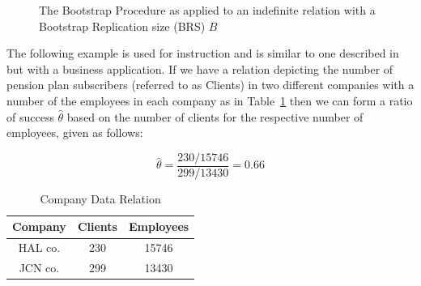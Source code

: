 \begin{figure}[ht]
\centerline{}
\caption{\label{rev:bootstrap} The Bootstrap Procedure as applied to an
indefinite relation with a Bootstrap Replication size (BRS) $B$}
\end{figure}

The following example is used for instruction and is similar
to one described in \cite{et93} but with a business 
application.
If we have a relation depicting the number of pension plan subscribers
(referred to as Clients) in 
two different companies with a number of the employees in
each company as in Table~\ref{table:3.01} then we can form a ratio of
success $\hat{\theta}$ based on the number of clients 
for the respective number of employees, given as follows:

\begin{displaymath}
\hat{\theta} = \frac{230 / 15746}{299 / 13430} = 0.66
\end{displaymath}

{\line
\begin{table}[ht]
\begin{center}
\begin{tabular}{|c|c|c|} \hline
Company & Clients & Employees \\ \hline
HAL co.	& 230		& 15746 \\
JCN co. & 299 		& 13430 \\ \hline
\end{tabular}
\end{center}
\caption{\label{table:3.01} Company Data Relation}
\end{table}
}

